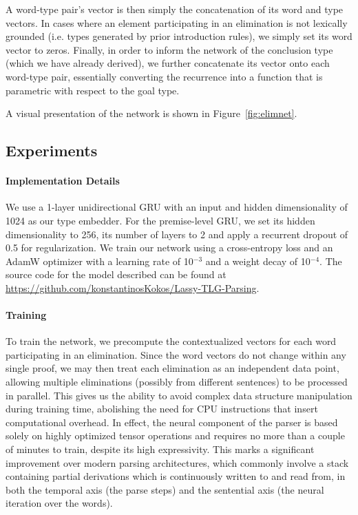 A word-type pair's vector is then simply the concatenation of its word and type vectors.
In cases where an element participating in an elimination is not lexically grounded (i.e. types generated by prior introduction rules), we simply set its word vector to zeros.
Finally, in order to inform the network of the conclusion type (which we have already derived), we further concatenate its vector onto each word-type pair, essentially converting the recurrence into a function that is parametric with respect to the goal type.

A visual presentation of the network is shown in Figure~\ref{fig:elimnet}.

\subsection{Experiments}
\paragraph{Implementation Details}
We use a 1-layer unidirectional GRU with an input and hidden dimensionality of 1024 as our type embedder.
For the premise-level GRU, we set its hidden dimensionality to 256, its number of layers to 2 and apply a recurrent dropout of 0.5 for regularization.
We train our network using a cross-entropy loss and an AdamW optimizer \cite{adamW} with a learning rate of 10${}^{-3}$ and a weight decay of 10${}^{-4}$.
The source code for the model described can be found at \url{https://github.com/konstantinosKokos/Lassy-TLG-Parsing}.


\paragraph{Training}
To train the network, we precompute the contextualized vectors for each word participating in an elimination. 
Since the word vectors do not change within any single proof, we may then treat each elimination as an independent data point, allowing multiple eliminations (possibly from different sentences) to be processed in parallel.
This gives us the ability to avoid complex data structure manipulation during training time, abolishing the need for CPU instructions that insert computational overhead.
In effect, the neural component of the parser is based solely on highly optimized tensor operations and requires no more than a couple of minutes to train, despite its high expressivity.
This marks a significant improvement over modern parsing architectures, which commonly involve a stack containing partial derivations which is continuously written to and read from, in both the temporal axis (the parse steps) and the sentential axis (the neural iteration over the words).

